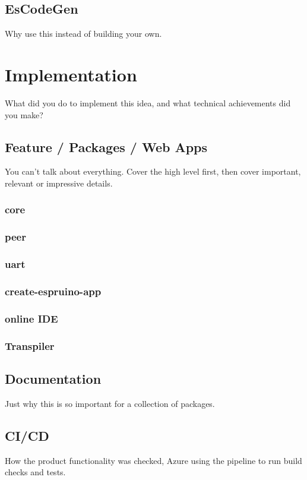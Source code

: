 \documentclass{l4proj}
\begin{document}
\section{EsCodeGen}
\text Why use this instead of building your own.
\chapter{Implementation}
What did you do to implement this idea, and what technical achievements did you make?
\section{Feature / Packages / Web Apps}
You can't talk about everything. Cover the high level first, then cover important, relevant or impressive details.
\subsection{core}
\subsection{peer}
\subsection{uart}
\subsection{create-espruino-app}
\subsection{online IDE}
\subsection{Transpiler}

\section{Documentation}
\text Just why this is so important for a collection of packages.
\section{CI/CD}
\text How the product functionality was checked, Azure using the pipeline to run build checks and tests.
\end{document}
